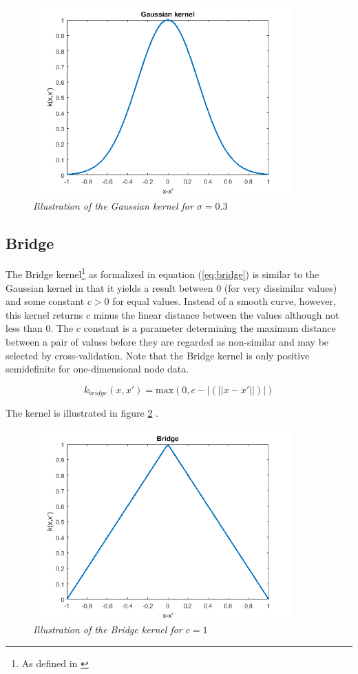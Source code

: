 \documentclass{article}
\begin{document}
\begin{figure}[H]
	\centering
	\includegraphics[width=10cm]{gaussian}
	\caption{\textit{Illustration of the Gaussian kernel for $\sigma = 0.3$}}
	\label{fig:gaussian_graph}
\end{figure}


\subsection{Bridge}
The Bridge kernel\footnote{As defined in \cite{shortest-path}} as formalized in equation (\ref{eq:bridge}) is similar to the Gaussian kernel in that it yields a result between 0 (for very dissimilar values) and some constant $c>0$ for equal values. Instead of a smooth curve, however, this kernel returns $c$ minus the linear distance between the values although not less than 0. The $c$ constant is a parameter determining the maximum distance between a pair of values before they are regarded as non-similar and may be selected by cross-validation. Note that the Bridge kernel is only positive semidefinite for one-dimensional node data.

\begin{equation}
\label{eq:bridge}
k_{bridge}(x, x') = \text{max}(0, c - |(||x - x'||)|)
\end{equation}

The kernel is illustrated in figure \ref{fig:bridge_graph} .

\begin{figure}[H]
	\centering
	\includegraphics[width=10cm]{bridge}
	\caption{\textit{Illustration of the Bridge kernel for $c=1$}}
	\label{fig:bridge_graph}
\end{figure}
\end{document}
